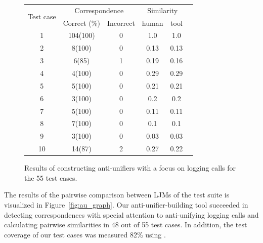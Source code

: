  
\begin{figure}
  \centering
  \begin{tabular}{|c|c|c|c|c|c|}
    \hline
    \multirow{2}{*}{Test case}&\multicolumn{2}{c|}{Correspondence}&\multicolumn{2}{c|}{Similarity}\\
    \cline{2-5}
    &Correct (\%)&Incorrect&human&tool\\
    \hline
    1&104(100)&0& 1.0 & 1.0\\
    \hline
    2&8(100)&0& 0.13& 0.13\\
    \hline
    3&6(85)&1&0.19& 0.16\\
    \hline
    4&4(100)&0&0.29 &0.29\\
    \hline
    5&5(100)&0&0.21 &0.21\\
    \hline
    6&3(100)&0&0.2 &0.2\\
    \hline
    7&5(100)&0&0.11 &0.11\\
    \hline
    8&7(100)&0& 0.1&0.1\\
    \hline
    9&3(100)&0&0.03&0.03 \\
    \hline
    10&14(87)&2&0.27 &0.22\\
    \hline
   
  \end{tabular}
  \caption{Results of constructing anti-unifiers with a focus on logging calls for the 55 test cases.}
  \label{study2_test_cases_results}
\end{figure}
 
The results of the pairwise comparison between LJMs of the test suite is visualized in Figure~\ref{fig:au_graph}. Our anti-unifier-building tool succeeded in detecting correspondences with special attention to anti-unifying logging calls and calculating pairwise similarities in 48 out of 55 test cases. In addition, the test coverage of our test cases was measured 82\% using .

